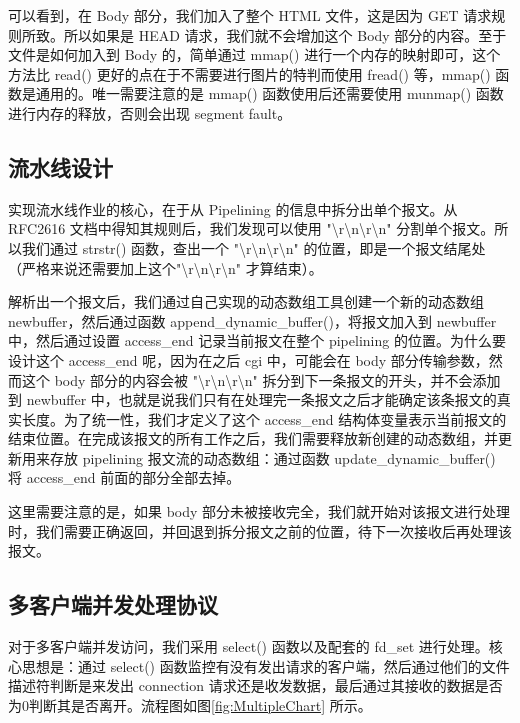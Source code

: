 可以看到，在 Body 部分，我们加入了整个 HTML 文件，这是因为 GET 请求规则所致。所以如果是 HEAD 请求，我们就不会增加这个 Body 部分的内容。至于文件是如何加入到 Body 的，简单通过 mmap() 进行一个内存的映射即可，这个方法比 read() 更好的点在于不需要进行图片的特判而使用 fread() 等，mmap() 函数是通用的。唯一需要注意的是 mmap() 函数使用后还需要使用 munmap() 函数进行内存的释放，否则会出现 segment fault。


\subsection{流水线设计}

实现流水线作业的核心，在于从 Pipelining 的信息中拆分出单个报文。从 RFC2616 文档中得知其规则后，我们发现可以使用 "\textbackslash r\textbackslash n\textbackslash r\textbackslash n" 分割单个报文。所以我们通过 strstr() 函数，查出一个 "\textbackslash r\textbackslash n\textbackslash r\textbackslash n" 的位置，即是一个报文结尾处（严格来说还需要加上这个"\textbackslash r\textbackslash n\textbackslash r\textbackslash n" 才算结束）。

解析出一个报文后，我们通过自己实现的动态数组工具创建一个新的动态数组 newbuffer，然后通过函数 append\_dynamic\_buffer()，将报文加入到 newbuffer 中，然后通过设置 access\_end 记录当前报文在整个 pipelining 的位置。为什么要设计这个 access\_end 呢，因为在之后 cgi 中，可能会在 body 部分传输参数，然而这个 body 部分的内容会被 "\textbackslash r\textbackslash n\textbackslash r\textbackslash n" 拆分到下一条报文的开头，并不会添加到 newbuffer 中，也就是说我们只有在处理完一条报文之后才能确定该条报文的真实长度。为了统一性，我们才定义了这个 access\_end 结构体变量表示当前报文的结束位置。在完成该报文的所有工作之后，我们需要释放新创建的动态数组，并更新用来存放 pipelining 报文流的动态数组：通过函数 update\_dynamic\_buffer() 将 access\_end 前面的部分全部去掉。

这里需要注意的是，如果 body 部分未被接收完全，我们就开始对该报文进行处理时，我们需要正确返回，并回退到拆分报文之前的位置，待下一次接收后再处理该报文。


\subsection{多客户端并发处理协议}

对于多客户端并发访问，我们采用 select() 函数以及配套的 fd\_set 进行处理。核心思想是：通过 select() 函数监控有没有发出请求的客户端，然后通过他们的文件描述符判断是来发出 connection 请求还是收发数据，最后通过其接收的数据是否为0判断其是否离开。流程图如图\ref{fig:MultipleChart} 所示。


